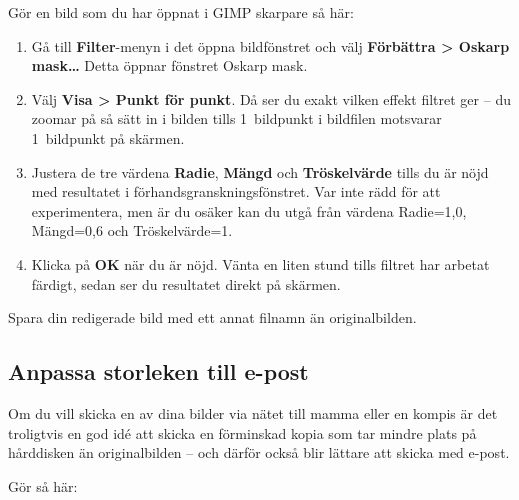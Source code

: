 \documentclass[a4paper,final]{memoir} %
\begin{document}
Gör en bild som du har öppnat i GIMP skarpare så här:

\begin{enumerate}

\item Gå till \textbf{Filter}-menyn i det öppna bildfönstret och välj \textbf{Förbättra \textgreater{} Oskarp mask\ldots{}} Detta öppnar fönstret Oskarp mask. 

\item Välj \textbf{Visa \textgreater{} Punkt för punkt}. Då ser du exakt vilken effekt filtret ger -- du zoomar på så sätt in i bilden tills 1~bildpunkt i bildfilen motsvarar 1~bildpunkt på skärmen. 

\item Justera de tre värdena \textbf{Radie}, \textbf{Mängd} och \textbf{Tröskelvärde} tills du är nöjd med resultatet i förhandsgranskningsfönstret. Var inte rädd för att experimentera, men är du osäker kan du utgå från värdena Radie=1,0, Mängd=0,6 och Tröskelvärde=1.

\item Klicka på \textbf{OK} när du är nöjd. Vänta en liten stund tills filtret har arbetat färdigt, sedan ser du resultatet direkt på skärmen. 

\end{enumerate}

Spara din redigerade bild med ett annat filnamn än originalbilden.

\subsection{Anpassa storleken till e-post}\label{sec:epost}


Om du vill skicka en av dina bilder via nätet till mamma eller en kompis är det troligtvis en god idé att skicka en förminskad kopia som tar mindre plats på hårddisken än originalbilden -- och därför också blir lättare att skicka med e-post. 

\label{fig:gimp-xp-skala}

Gör så här:
\end{document}
